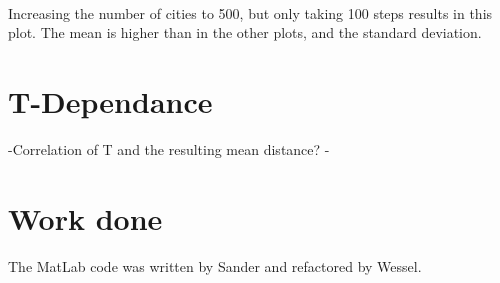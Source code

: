 \documentclass[10pt,a4paper]{article}
\begin{document}
 \\
Increasing the number of cities to 500, but only taking 100 steps results in this plot. The mean is higher than in the other plots, and the standard deviation.

\section{T-Dependance}
-Correlation of T and the resulting mean distance?
-
\section{Work done}
The MatLab code was written by Sander and refactored by Wessel. 
\end{document}
